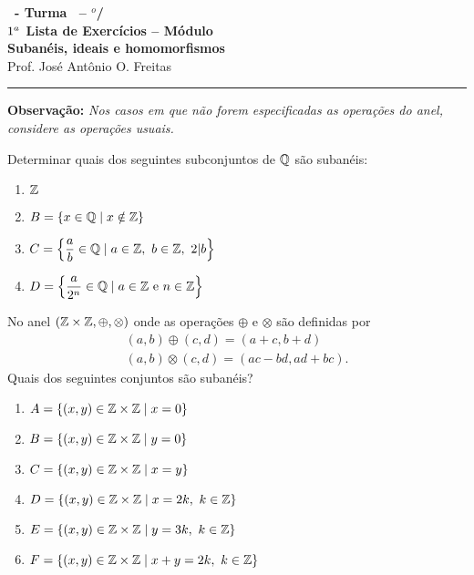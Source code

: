 \documentclass[12pt]{exam}
\begin{document}
    \begin{center}
    {\Large\bf \disciplina\ - Turma \turma\ -- \semestre$^{o}$/\ano} \\ \vspace{9pt} {\large\bf
        $1^a$ Lista de Exercícios -- Módulo \numeromodulo\\ Subanéis, ideais e homomorfismos}\\ \vspace{9pt} Prof. José Antônio O. Freitas
    \end{center}
    \hrule

    \vspace{.6cm}

    \textbf{Observação: }\textit{Nos casos em que não forem especificadas as operações do anel, considere as operações usuais.}

\vspace{.6cm}

\questao{} Determinar quais dos seguintes subconjuntos de $\mathbb{Q}$ são subanéis:
\begin{multicols}{2}
    \begin{enumerate}[label=({\alph*})]
        \item $\mathbb{Z}$
        \item $B = \{x \in \mathbb{Q} \mid x \notin \mathbb{Z}\}$
        \item $C = \left\{\dfrac{a}{b} \in \mathbb{Q} \mid a \in \mathbb{Z},\ b \in \mathbb{Z},\ 2 |b \right\}$
        \item $D = \left\{\dfrac{a}{2^n} \in \mathbb{Q} \mid a \in \mathbb{Z} \mbox{ e } n \in \mathbb{Z} \right\}$
    \end{enumerate}
\end{multicols}

\vspace{.3cm}

\questao{} No anel $(\mathbb{Z} \times \mathbb{Z}, \oplus, \otimes)$ onde as operações $\oplus$ e $\otimes$ são definidas por
\begin{align*}
    (a, b) \oplus (c, d) = (a + c, b + d)\\
    (a ,b) \otimes (c, d) = (ac - bd, ad + bc).
\end{align*}
Quais dos seguintes conjuntos são subanéis?
\begin{enumerate}[label=({\alph*})]
    \item $A = \{(x, y) \in \mathbb{Z} \times \mathbb{Z} \mid x = 0\}$
    \item $B = \{(x, y) \in \mathbb{Z} \times \mathbb{Z} \mid y = 0\}$
    \item $C = \{(x, y) \in \mathbb{Z} \times \mathbb{Z} \mid x = y\}$
    \item $D = \{(x, y) \in \mathbb{Z} \times \mathbb{Z} \mid x = 2k,\ k \in \mathbb{Z}\}$
    \item $E = \{(x, y) \in \mathbb{Z} \times \mathbb{Z} \mid y = 3k,\ k \in \mathbb{Z}\}$
    \item $F = \{(x, y) \in \mathbb{Z} \times \mathbb{Z} \mid x + y = 2k,\ k \in \mathbb{Z}\}$
\end{enumerate}
\end{document}
